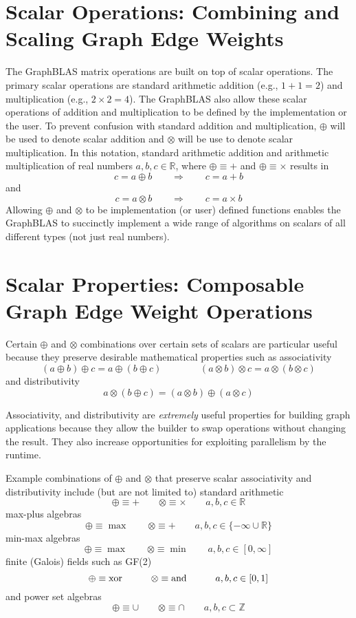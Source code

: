 \section{Scalar Operations: Combining and Scaling Graph Edge Weights}
  The GraphBLAS matrix operations are built on top of scalar operations.  The primary scalar operations are standard arithmetic addition (e.g., $1 + 1 = 2$) and multiplication (e.g., $2 \times 2 = 4$).  The GraphBLAS also allow these scalar operations of addition and multiplication to be defined by the implementation or the user.  To prevent confusion with standard addition and multiplication, $\oplus$ will be used to denote scalar addition and $\otimes$ will be use to denote scalar multiplication.  In this notation, standard arithmetic addition and arithmetic multiplication of real numbers $a, b, c \in \mathbb{R}$, where $\oplus \equiv +$ and $\oplus \equiv \times$ results in
$$
   c = a \oplus b  ~~~~~~~~~ \Rightarrow ~~~~~~~~~ c = a + b
$$
and
$$
   c = a \otimes b  ~~~~~~~~~ \Rightarrow ~~~~~~~~~ c = a \times b
$$
Allowing $\oplus$ and $\otimes$ to be implementation (or user) defined functions enables the GraphBLAS to succinctly implement a wide range of algorithms on scalars of all different types (not just real numbers).

\section{Scalar Properties: Composable Graph Edge Weight Operations}
  Certain $\oplus$ and $\otimes$ combinations  over certain sets of scalars are particular useful because they preserve desirable mathematical properties such as
associativity
$$
 (a \oplus b) \oplus c = a \oplus (b \oplus c) ~~~~~~~~~ ~~~~~~~~~ (a \otimes b) \otimes c = a \otimes (b \otimes c)
$$
and distributivity
$$
 a \otimes (b \oplus c)  = (a \otimes b) \oplus (a \otimes c)
$$

Associativity, and distributivity are \emph{extremely} useful properties for building graph applications because they allow the builder to swap operations without changing the result. They also increase opportunities for exploiting parallelism by the runtime. 

  Example combinations of $\oplus$ and $\otimes$ that preserve scalar associativity and distributivity include (but are not limited to) standard arithmetic
$$
  \oplus \equiv + ~~~~~~~~~ \otimes \equiv \times ~~~~~~~~~ a, b, c \in \mathbb{R}
$$
max-plus algebras
$$
  \oplus \equiv \max ~~~~~~~~~ \otimes \equiv + ~~~~~~~~~ a, b, c \in \{-\infty \cup \mathbb{R}\}
$$
min-max algebras
$$
  \oplus \equiv \max ~~~~~~~~~ \otimes \equiv \min ~~~~~~~~~ a, b, c \in [0,\infty]
$$
finite (Galois) fields such as GF(2)
$$
  \oplus \equiv {\rm xor} ~~~~~~~~~ \otimes \equiv {\rm and} ~~~~~~~~~ a, b, c \in [0,1]
$$
and power set algebras
$$
  \oplus \equiv \cup ~~~~~~~~~ \otimes \equiv \cap ~~~~~~~~~ a, b, c \subset \mathbb{Z}
$$

